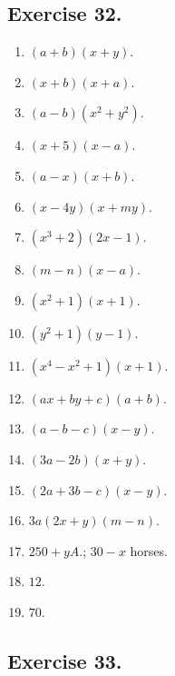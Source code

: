 \documentclass{book}
\begin{document}
\subsection*{Exercise 32.}

\begin{enumerate}
\item $(a+b)(x+y)$.
\item $(x+b)(x+a)$.
\item $(a-b)(x^2+y^2)$.
\item $(x+5)(x-a)$.
\item $(a-x)(x+b)$.
\item $(x-4y)(x+my)$.
\item $(x^3+2)(2x-1)$.
\item $(m-n)(x-a)$.
\item $(x^2+1)(x+1)$.

\item $(y^2 + 1)(y - 1)$.
\item $(x^4 - x^2 + 1)(x + 1)$.
\item $(ax + by + c)(a + b)$.
\item $(a - b - c)(x - y)$.
\item $(3a - 2b)(x + y)$.
\item $(2a + 3b - c)(x - y)$.
\item $3a(2x + y)(m - n)$.
\item $250 + yA$.; $30 - x$ horses.
\item $12$.
\item $70$.
\end{enumerate}

\subsection*{Exercise 33.}
\end{document}
